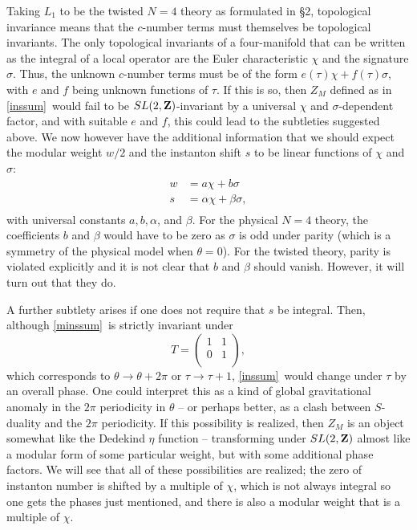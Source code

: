 \documentclass[12pt]{article}
\numberwithin{equation}{section}
\begin{document}
Taking $L_1$ to be the twisted $N=4$ theory as formulated in \S2,
topological invariance means that the
$c$-number terms must themselves be topological invariants.  The only
topological invariants of a four-manifold that can be written
as the integral of a local operator are the Euler characteristic $\chi$
and the signature $\sigma$.  Thus, the unknown $c$-number terms must
be of the form $e(\tau)\chi+f(\tau)\sigma$, with $e$ and $f$ being
unknown functions of $\tau$.  If this is so, then $Z_M$ defined
as in \eqref{inssum}\ would fail to be $SL(2,{\bf Z})$-invariant by
a universal $\chi$ and $\sigma$-dependent factor, and with suitable
$e$ and $f$, this could lead to the subtleties suggested above.
We now however have the additional information that we should
expect the modular weight $w/2$ and the instanton shift $s$ to be linear
functions of $\chi$ and $\sigma$:
\begin{equation}
  \label{rolf}
  \begin{aligned} w & = a\chi +b\sigma \\ s & = \alpha\chi+\beta\sigma,\\
  \end{aligned}
\end{equation}
with universal constants $a,b,\alpha$, and $\beta$.
For the physical $N=4$ theory, the coefficients $b$ and $\beta$ would
have to be zero as $\sigma$ is odd under parity (which is a symmetry
of the physical model when $\theta=0$).  For the twisted
theory, parity is violated explicitly and it is not clear
that $b$ and $\beta$ should vanish.  However, it will turn out that they do.

A further subtlety arises if one does not require that $s$ be
integral.  Then, although \eqref{minssum}\ is strictly invariant
under
\begin{equation}
  \label{ulg}
  T=
  \begin{pmatrix}1 & 1 \\ 0 & 1\\
  \end{pmatrix},
\end{equation}
which corresponds to $\theta\to\theta+2\pi$ or
$\tau\to \tau+1$, \eqref{inssum}\ would
change under $\tau$ by an overall phase.
One could interpret this as a kind of global gravitational anomaly
in the $2\pi$ periodicity in $\theta$ -- or perhaps better,
as a clash between $S$-duality and the $2\pi$ periodicity.
If this possibility is realized, then $Z_M$ is an object
somewhat like the Dedekind $\eta$ function -- transforming under
$SL(2,{\bf Z})$ almost like a modular form of some particular weight,
but with some additional phase factors.
We will see that all of these possibilities are realized;
the zero of instanton number is shifted by a multiple of $\chi$, which
is not always integral so one gets the phases just mentioned,
and there is also a modular weight that is a multiple of $\chi$.
\end{document}
